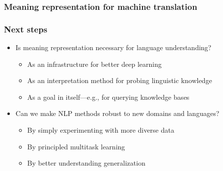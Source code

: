 \documentclass[t,xcolor={svgnames,table}]{beamer}
\begin{document}
\begin{frame}
\frametitle{Meaning representation for machine translation}

\end{frame}

\begin{frame}
\frametitle{Next steps}
\begin{itemize}
 \item Is meaning representation necessary for language understanding?\pause
 \begin{itemize}
 \item As an infrastructure for better deep learning\pause
 \item As an interpretation method for probing linguistic knowledge\pause
 \item {As a goal in itself---e.g., for querying knowledge bases}\pause
 \end{itemize}
 \vfill
 \item Can we make NLP methods robust to new domains and languages?\pause
 \begin{itemize}
 \item By simply experimenting with more diverse data\pause
 \item By principled multitask learning\pause
 \item By better understanding generalization
 \end{itemize}
\end{itemize}
\end{frame}
\end{document}
